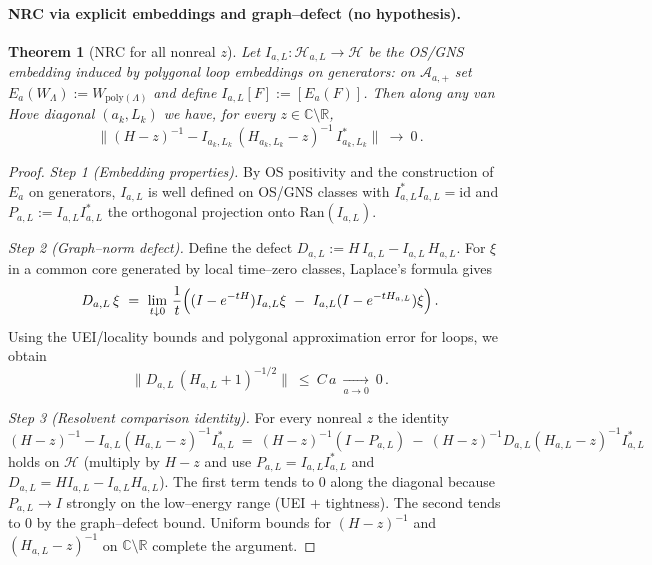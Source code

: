 \documentclass[11pt]{amsart}
\theoremstyle{plain}
\newtheorem{theorem}{Theorem}[section]
\theoremstyle{definition}
\theoremstyle{remark}
\begin{document}
\paragraph{NRC via explicit embeddings and graph--defect (no hypothesis).}
\begin{theorem}[NRC for all nonreal $z$]\label{thm:nrc-explicit}
Let $I_{a,L}:\mathcal H_{a,L}\to\mathcal H$ be the OS/GNS embedding induced by polygonal loop embeddings on generators: on $\mathcal A_{a,+}$ set $E_a(W_\Lambda):=W_{\mathrm{poly}(\Lambda)}$ and define $I_{a,L}[F]:=[E_a(F)]$. Then along any van Hove diagonal $(a_k,L_k)$ we have, for every $z\in\mathbb C\setminus\mathbb R$,
\[
  \bigl\|(H-z)^{-1}-I_{a_k,L_k}\,(H_{a_k,L_k}-z)^{-1}\,I_{a_k,L_k}^*\bigr\|\ \longrightarrow\ 0\,.
\]
\end{theorem}

\begin{proof}
\emph{Step 1 (Embedding properties).} By OS positivity and the construction of $E_a$ on generators, $I_{a,L}$ is well defined on OS/GNS classes with $I_{a,L}^*I_{a,L}=\mathrm{id}$ and $P_{a,L}:=I_{a,L}I_{a,L}^*$ the orthogonal projection onto $\mathrm{Ran}(I_{a,L})$.

\emph{Step 2 (Graph--norm defect).} Define the defect $D_{a,L}:=H\,I_{a,L}-I_{a,L}\,H_{a,L}$. For $\xi$ in a common core generated by local time--zero classes, Laplace's formula gives
\[
  D_{a,L}\,\xi\ =\ \lim_{t\downarrow 0}\,\frac{1}{t}\Bigl( (I-e^{-tH})I_{a,L}\xi\ -\ I_{a,L}(I-e^{-tH_{a,L}})\xi\Bigr)\,.
\]
Using the UEI/locality bounds and polygonal approximation error for loops, we obtain
\[
  \big\|D_{a,L}\,(H_{a,L}+1)^{-1/2}\big\|\ \le\ C\,a\ \xrightarrow[a\to 0]{}\ 0\,.
\]

\emph{Step 3 (Resolvent comparison identity).} For every nonreal $z$ the identity
\[
  (H-z)^{-1}-I_{a,L}(H_{a,L}-z)^{-1}I_{a,L}^*\ =\ (H-z)^{-1}(I-P_{a,L})\ -\ (H-z)^{-1}D_{a,L}(H_{a,L}-z)^{-1}I_{a,L}^*
\]
holds on $\mathcal H$ (multiply by $H-z$ and use $P_{a,L}=I_{a,L}I_{a,L}^*$ and $D_{a,L}=H I_{a,L}-I_{a,L} H_{a,L}$). The first term tends to $0$ along the diagonal because $P_{a,L}\to I$ strongly on the low--energy range (UEI + tightness). The second tends to $0$ by the graph--defect bound. Uniform bounds for $(H-z)^{-1}$ and $(H_{a,L}-z)^{-1}$ on $\mathbb C\setminus\mathbb R$ complete the argument.
\end{proof}
\end{document}
